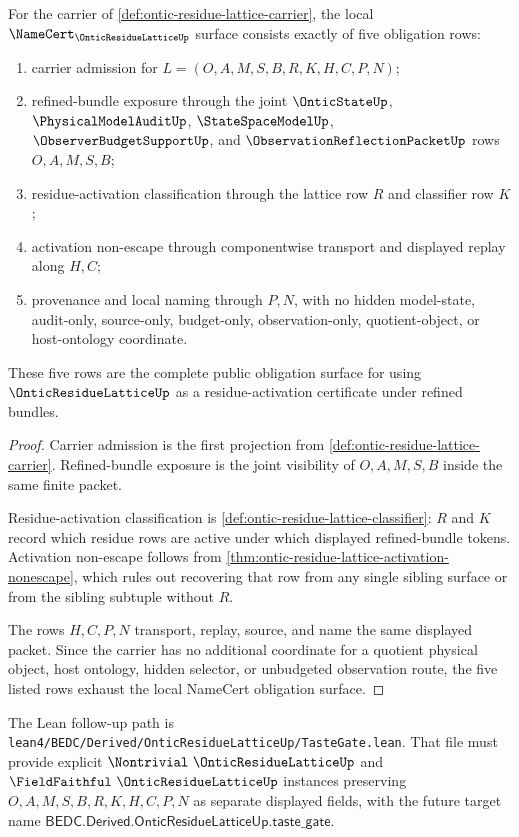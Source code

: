 \begin{theorem}
\label{thm:ontic-residue-lattice-namecert-obligation-surface}
For the carrier of \autoref{def:ontic-residue-lattice-carrier}, the local $\NameCert_{\OnticResidueLatticeUp}$ surface consists exactly of five obligation rows:
\begin{enumerate}
\item carrier admission for $L=(O,A,M,S,B,R,K,H,C,P,N)$;
\item refined-bundle exposure through the joint $\OnticStateUp$, $\PhysicalModelAuditUp$, $\StateSpaceModelUp$, $\ObserverBudgetSupportUp$, and $\ObservationReflectionPacketUp$ rows $O,A,M,S,B$;
\item residue-activation classification through the lattice row $R$ and classifier row $K$;
\item activation non-escape through componentwise transport and displayed replay along $H,C$;
\item provenance and local naming through $P,N$, with no hidden model-state, audit-only, source-only, budget-only, observation-only, quotient-object, or host-ontology coordinate.
\end{enumerate}
These five rows are the complete public obligation surface for using $\OnticResidueLatticeUp$ as a residue-activation certificate under refined bundles.
\end{theorem}
\begin{proof}
Carrier admission is the first projection from \autoref{def:ontic-residue-lattice-carrier}. Refined-bundle exposure is the joint visibility of $O,A,M,S,B$ inside the same finite packet.

Residue-activation classification is \autoref{def:ontic-residue-lattice-classifier}: $R$ and $K$ record which residue rows are active under which displayed refined-bundle tokens. Activation non-escape follows from \autoref{thm:ontic-residue-lattice-activation-nonescape}, which rules out recovering that row from any single sibling surface or from the sibling subtuple without $R$.

The rows $H,C,P,N$ transport, replay, source, and name the same displayed packet. Since the carrier has no additional coordinate for a quotient physical object, host ontology, hidden selector, or unbudgeted observation route, the five listed rows exhaust the local NameCert obligation surface.
\end{proof}

The Lean follow-up path is \texttt{lean4/BEDC/Derived/OnticResidueLatticeUp/TasteGate.lean}. That file must provide explicit $\Nontrivial\ \OnticResidueLatticeUp$ and $\FieldFaithful\ \OnticResidueLatticeUp$ instances preserving $O,A,M,S,B,R,K,H,C,P,N$ as separate displayed fields, with the future target name $\mathsf{BEDC.Derived.OnticResidueLatticeUp.taste\_gate}$.

